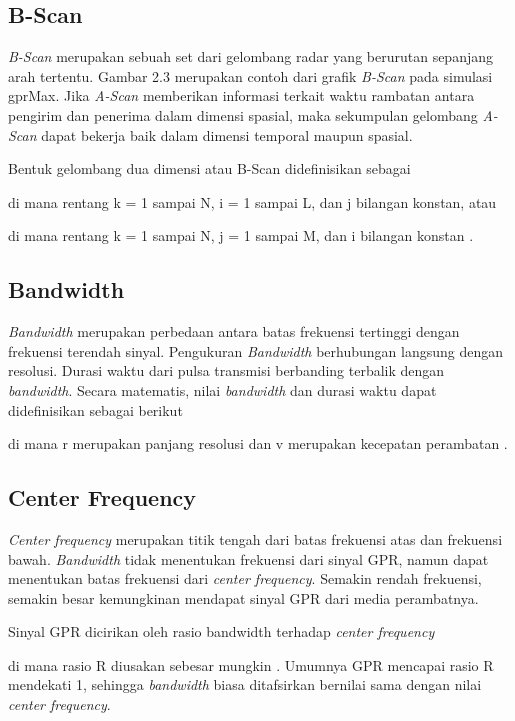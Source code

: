 \subsection{B-Scan}
\label{subsec:bScan}

\emph{B-Scan} merupakan sebuah set dari gelombang radar yang berurutan sepanjang arah tertentu. 
Gambar 2.3 merupakan contoh dari grafik \emph{B-Scan} pada simulasi gprMax. 
Jika \emph{A-Scan} memberikan informasi terkait waktu rambatan antara pengirim dan penerima dalam dimensi spasial, maka sekumpulan gelombang \emph{A-Scan} dapat bekerja baik dalam dimensi temporal maupun spasial.

Bentuk gelombang dua dimensi atau B-Scan didefinisikan sebagai

di mana rentang k = 1 sampai N, i = 1 sampai L, dan j bilangan konstan, atau

di mana rentang k = 1 sampai N, j = 1 sampai M, dan i bilangan konstan \parencite{danielDvd}.

\subsection{Bandwidth}
\label{subsec:bandwidth}

\emph{Bandwidth} merupakan perbedaan antara batas frekuensi tertinggi dengan frekuensi terendah sinyal. 
Pengukuran \emph{Bandwidth} berhubungan langsung dengan resolusi. 
Durasi waktu dari pulsa transmisi berbanding terbalik dengan \emph{bandwidth}. 
Secara matematis, nilai \emph{bandwidth} dan durasi waktu dapat didefinisikan sebagai berikut

di mana r merupakan panjang resolusi dan v merupakan kecepatan perambatan \parencite{jol2008ground}.

\subsection{Center Frequency}
\label{subsec:centerFrequency}

\emph{Center frequency} merupakan titik tengah dari batas frekuensi atas dan frekuensi bawah. 
\emph{Bandwidth} tidak menentukan frekuensi dari sinyal GPR, namun dapat menentukan batas frekuensi dari \emph{center frequency}.
Semakin rendah frekuensi, semakin besar kemungkinan mendapat sinyal GPR dari media perambatnya.

Sinyal GPR dicirikan oleh rasio bandwidth terhadap \emph{center frequency}

di mana rasio R diusakan sebesar mungkin \parencite{jol2008ground}. 
Umumnya GPR mencapai rasio R mendekati 1, sehingga \emph{bandwidth} biasa ditafsirkan bernilai sama dengan nilai \emph{center frequency}.

